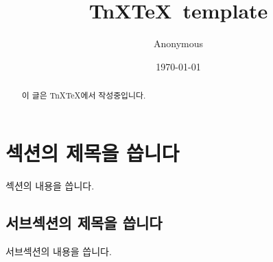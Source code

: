 \documentclass[a4paper,itemph,amsmath]{xoblivoir}
\begin{document}
\title{TnX\TeX\ template}
\author{Anonymous}
\date{\today}

\maketitle

\begin{abstract}
 이 글은 TnX\TeX 에서 작성중입니다.
\end{abstract}

\section{섹션의 제목을 씁니다}

섹션의 내용을 씁니다.

\subsection{서브섹션의 제목을 씁니다}
서브섹션의 내용을 씁니다.

\end{document}

